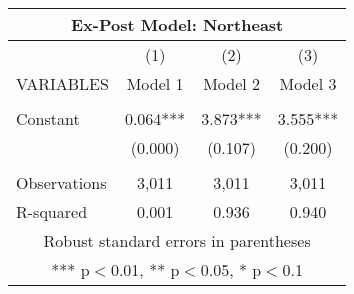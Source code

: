 \begin{tabular}{lccc}
\multicolumn{4}{c}{Ex-Post Model: Northeast} \\ \hline
 & (1) & (2) & (3) \\
VARIABLES & Model 1 & Model 2 & Model 3 \\ \hline
 &  &  &  \\
Constant & 0.064*** & 3.873*** & 3.555*** \\
 & (0.000) & (0.107) & (0.200) \\
 &  &  &  \\
Observations & 3,011 & 3,011 & 3,011 \\
 R-squared & 0.001 & 0.936 & 0.940 \\ \hline
\multicolumn{4}{c}{ Robust standard errors in parentheses} \\
\multicolumn{4}{c}{ *** p$<$0.01, ** p$<$0.05, * p$<$0.1} \\
\end{tabular}

